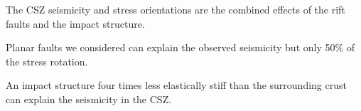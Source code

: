 \documentclass[draft]{agujournal2018}
\begin{document}




\begin{keypoints}
  
  \item The CSZ seismicity and stress orientations are the combined effects of the rift faults and the impact structure.

  \item Planar faults we considered can explain the observed seismicity but only 50$\%$ of the stress rotation.

  \item An impact structure four times less elastically stiff than the surrounding crust can explain the seismicity in the CSZ.
  
\end{keypoints}

%
%

\end{document}
